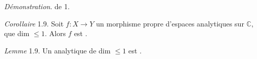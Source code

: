\documentclass[11pt,a4paper]{article}
\begin{document}
\emph{Démonstration}.  de 1.\ill{} \ill{}


\emph{Corollaire}  1.9. \struck{\ill{}} Soit $f : X \to Y$ un morphisme propre d'espaces analytiques \struck{\ill{}} sur $\mathbb{C}$, \struck{\ill{} \ill{} \ill{}}  que \ill{} \ill{} \ill{} dim $\leq 1$. Alors $f$ est  .

 \ill{}

\emph{Lemme} 1.9. Un  \ill{} analytique  de dim $\leq 1$ est .
\end{document}
